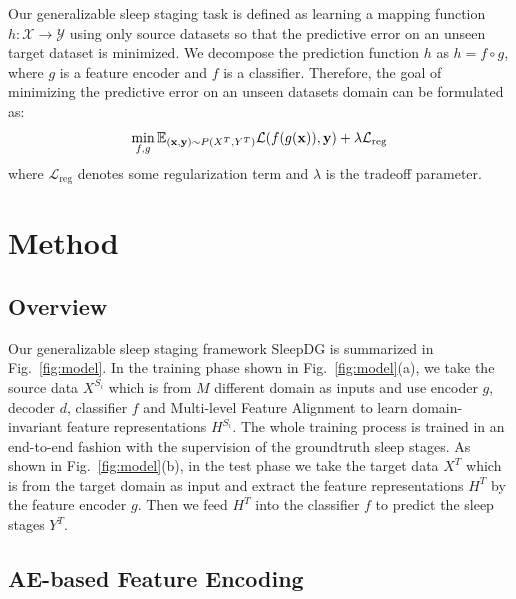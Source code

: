 \documentclass[letterpaper]{article} %
\begin{document}
	Our generalizable sleep staging task is defined as learning a mapping function $h:\mathcal{X} \rightarrow \mathcal{Y}$ using only source datasets so that the predictive error on an unseen target dataset is minimized.
	We decompose the prediction function $h$ as $h = f \circ g$, where $g$ is a feature encoder and $f$ is a classifier.
	Therefore, the goal of minimizing the predictive error on an unseen datasets domain can be formulated as:
	\begin{equation}
		\label{eq:goal}
		\small
		\min_{f,g} \mathbb{E}_{(\mathrm{\mathbf{x}}, \mathrm{\mathbf{y}}) \sim P(X^T, Y^T)} \mathcal{L}(f(g(\mathrm{\mathbf{x}})), \mathrm{\mathbf{y}}) + \lambda \mathcal{L}_{\mathrm{reg}}
	\end{equation}
	where $\mathcal{L}_{\mathrm{reg}}$ denotes some regularization term and $\lambda$ is the tradeoff parameter.

	\section{Method}
	\subsection{Overview}


	Our generalizable sleep staging framework SleepDG is summarized in Fig.~\ref{fig:model}.
	In the training phase shown in Fig.~\ref{fig:model}(a), we take the source data $X^{S_i}$ which is from $M$ different domain as inputs and use encoder $g$, decoder $d$, classifier $f$ and Multi-level Feature Alignment to learn domain-invariant feature representations $H^{S_i}$.
	The whole training process is trained in an end-to-end fashion with the supervision of the groundtruth sleep stages.
	As shown in Fig.~\ref{fig:model}(b), in the test phase we take the target data $X^T$ which is from the target domain as input and extract the feature representations $H^T$ by the feature encoder $g$.
	Then we feed $H^T$ into the classifier $f$ to predict the sleep stages $Y^T$.

	\subsection{AE-based Feature Encoding}
\end{document}
